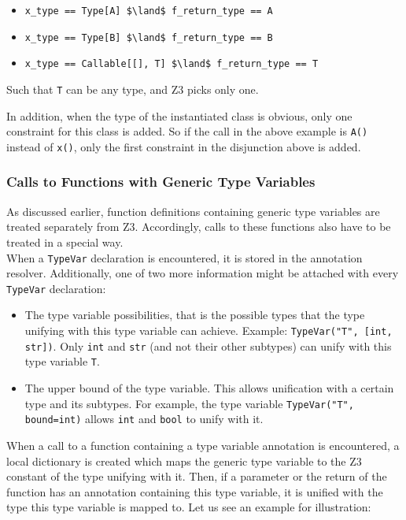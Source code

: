 \begin{itemize}
	\item \lstinline[mathescape]|x_type == Type[A] $\land$ f_return_type == A|
	\item \lstinline[mathescape]|x_type == Type[B] $\land$ f_return_type == B|
	\item \lstinline[mathescape]|x_type == Callable[[], T] $\land$ f_return_type == T|
\end{itemize}
Such that \lstinline|T| can be any type, and Z3 picks only one.

In addition, when the type of the instantiated class is obvious, only one constraint for this class is added. So if the call in the above example is \lstinline|A()| instead of \lstinline|x()|, only the first constraint in the disjunction above is added.

\subsubsection{Calls to Functions with Generic Type Variables}
As discussed earlier, function definitions containing generic type variables are treated separately from Z3. Accordingly, calls to these functions also have to be treated in a special way.\\

When a \lstinline|TypeVar| declaration is encountered, it is stored in the annotation resolver. Additionally, one of two more information might be attached with every \lstinline|TypeVar| declaration:
\begin{itemize}
	\item The type variable possibilities, that is the possible types that the type unifying with this type variable can achieve. Example: \lstinline|TypeVar("T", [int, str])|. Only \lstinline|int| and \lstinline|str| (and not their other subtypes) can unify with this type variable \lstinline|T|.
	\item The upper bound of the type variable. This allows unification with a certain type and its subtypes. For example, the type variable \lstinline|TypeVar("T", bound=int)| allows \lstinline|int| and \lstinline|bool| to unify with it.
\end{itemize}
When a call to a function containing a type variable annotation is encountered, a local dictionary is created which maps the generic type variable to the Z3 constant of the type unifying with it. Then, if a parameter or the return of the function has an annotation containing this type variable, it is unified with the type this type variable is mapped to. Let us see an example for illustration:


